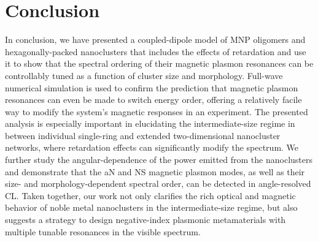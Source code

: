 \documentclass [11pt, proquest] {uwthesis}[2016/11/22]
\begin{document}
\section*{Conclusion}
In conclusion, we have presented a coupled-dipole model of MNP oligomers and hexagonally-packed nanoclusters that includes the effects of retardation and use it to show that the spectral ordering of their magnetic plasmon resonances can be controllably tuned as a function of cluster size and morphology. Full-wave numerical simulation is used to confirm the prediction that magnetic plasmon resonances can even be made to switch energy order, offering a relatively facile way to modify the system's magnetic responses in an experiment. The presented analysis is especially important in elucidating the intermediate-size regime in between individual single-ring and extended two-dimensional nanocluster networks, where retardation effects can significantly modify the spectrum. We further study the angular-dependence of the power emitted from the nanoclusters and demonstrate that the aN and NS magnetic plasmon modes, as well as their size- and morphology-dependent spectral order, can be detected in angle-resolved CL. Taken together, our work not only clarifies the rich optical and magnetic behavior of noble metal nanoclusters in the intermediate-size regime, but also suggests a strategy to design negative-index plasmonic metamaterials with multiple tunable resonances in the visible spectrum.
\end{document}
